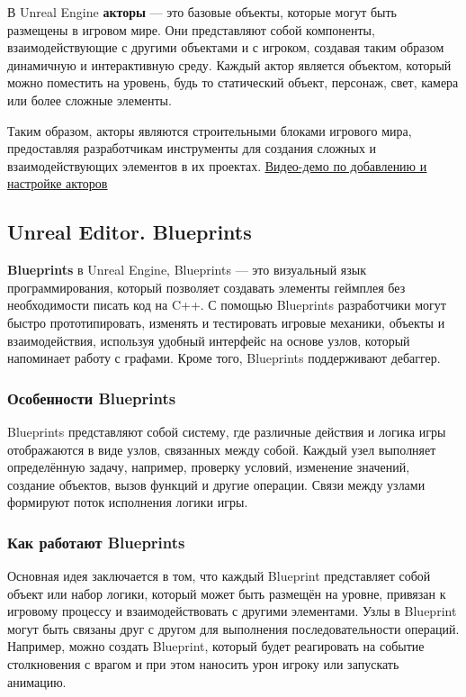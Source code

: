 В Unreal Engine \textbf{акторы} — это базовые объекты, которые могут быть размещены в игровом мире. Они представляют собой компоненты, взаимодействующие с другими объектами и с игроком, создавая таким образом динамичную и интерактивную среду. Каждый актор является объектом, который можно поместить на уровень, будь то статический объект, персонаж, свет, камера или более сложные элементы.

Таким образом, акторы являются строительными блоками игрового мира, предоставляя разработчикам инструменты для создания сложных и взаимодействующих элементов в их проектах.
\newline
\href{https://drive.google.com/file/d/1P7qvUCVR0QDYNwac208ljSlgfe7RYyHY/view?usp=drive_link}{\underline{Видео-демо по добавлению и настройке акторов}}

\subsection{Unreal Editor. Blueprints}

\textbf{Blueprints} в Unreal Engine, Blueprints — это визуальный язык программирования, который позволяет создавать элементы геймплея без необходимости писать код на C++. С помощью Blueprints разработчики могут быстро прототипировать, изменять и тестировать игровые механики, объекты и взаимодействия, используя удобный интерфейс на основе узлов, который напоминает работу с графами. Кроме того, Blueprints поддерживают дебаггер.

\subsubsection{Особенности Blueprints}
Blueprints представляют собой систему, где различные действия и логика игры отображаются в виде узлов, связанных между собой. Каждый узел выполняет определённую задачу, например, проверку условий, изменение значений, создание объектов, вызов функций и другие операции. Связи между узлами формируют поток исполнения логики игры.

\subsubsection{Как работают Blueprints}
Основная идея заключается в том, что каждый Blueprint представляет собой объект или набор логики, который может быть размещён на уровне, привязан к игровому процессу и взаимодействовать с другими элементами. Узлы в Blueprint могут быть связаны друг с другом для выполнения последовательности операций. Например, можно создать Blueprint, который будет реагировать на событие столкновения с врагом и при этом наносить урон игроку или запускать анимацию.

